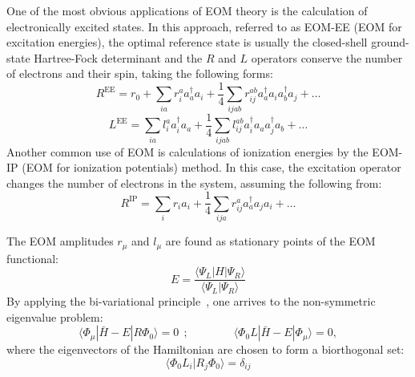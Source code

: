 \documentclass[journal=jctcce,manuscript=article]{achemso}
\begin{document}
One of the most obvious applications of EOM theory is the calculation of electronically excited states\cite{sekino1984linear,Stanton:93:EOMCC}. In this approach, referred to as EOM-EE (EOM for excitation energies), the optimal reference state is usually the closed-shell ground-state Hartree-Fock determinant and the $R$ and $L$ operators conserve the number of electrons and their spin, taking the following forms:
\begin{equation}
R^\text{EE}= r_0 + \sum_{ia} r_i^a a_a^\dagger a_i + \frac{1}{4} \sum_{ijab} r_{ij}^{ab} a_a^\dagger a_i a_b^\dagger a_j + \dots
\end{equation}
\begin{equation}
L^\text{EE}= \sum_{ia} l_i^a a_i^\dagger a_a + \frac{1}{4} \sum_{ijab} l_{ij}^{ab} a_i^\dagger a_a a_j^\dagger a_b + \dots
\end{equation}
Another common use of EOM is calculations of ionization energies by the EOM-IP (EOM for ionization potentials)
method\cite{Stanton:94:AnlDer,Stanton:EOMRev:03,PAP:EOMIP}. In this case, the excitation operator changes the number of electrons in the system, assuming the 
following from:
\begin{equation}
R^\text{IP}= \sum_{i} r_i a_i + \frac{1}{4} \sum_{ija} r_{ij}^{a} a_a^\dagger  a_j a_i + \dots
\end{equation}

The EOM amplitudes $r_\mu$ and $l_\mu$ are found as stationary points of the EOM functional:
\begin{equation}
E = \frac{\langle \Psi_L| H | \Psi_R \rangle}{\langle \Psi_L | \Psi_R \rangle} 
\end{equation}
By applying the bi-variational principle~\cite{Bivariational_Lowdin,levchenko2004equation}, one arrives  
to the non-symmetric eigenvalue problem:
\begin{equation}
\langle \Phi_\mu | \bar{H} - E | R \Phi_0 \rangle = 0~~; 
\qquad\qquad
\langle \Phi_0 L | \bar{H} - E | \Phi_\mu \rangle = 0, 
\end{equation}
where the eigenvectors of the Hamiltonian are chosen to form a biorthogonal set\cite{Stanton:93:EOMCC}: 
\begin{equation}
\langle \Phi_0 L_i| R_j \Phi_0 \rangle = \delta_{ij}
\end{equation}
\end{document}
